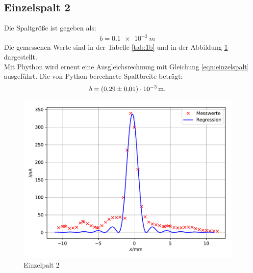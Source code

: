 \subsection{Einzelspalt 2}
Die Spaltgröße ist gegeben als:
\begin{align*}
  b=\SI{0,1e-3}{m}
\end{align*}
Die gemessenen Werte sind in der Tabelle \ref{tab:1b} und in der Abbildung \ref{fig:1b} dargestellt.\\
Mit Phython wird erneut eine Ausgleichsrechnung mit Gleichung \ref{eqn:einzelspalt} ausgeführt.
Die von Python berechnete Spaltbreite beträgt:
\begin{align*}
  b = \SI{0.29\pm0.01e-3}{m}.
\end{align*}

\begin{figure}
  \includegraphics{1b.pdf}
  \caption{Einzelpalt 2}
  \label{fig:1b}
\end{figure}
\FloatBarrier

